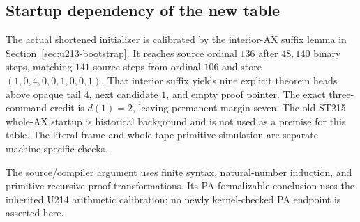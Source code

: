 \subsection{Startup dependency of the new table}

The actual shortened initializer is calibrated by the interior-AX
suffix lemma in Section~\ref{sec:u213-bootstrap}.  It reaches source
ordinal $136$ after $48{,}140$ binary steps, matching $141$ source
steps from ordinal $106$ and store $(1,0,4,0,0,1,0,0,1)$.
That interior suffix yields nine explicit theorem heads above opaque
tail $4$, next candidate $1$, and empty proof pointer.  The exact
three-command credit is $d(1)=2$, leaving permanent margin seven.
The old ST215 whole-AX startup is historical background and is not
used as a premise for this table.  The literal frame and whole-tape
primitive simulation are separate machine-specific checks.

The source/compiler argument uses finite syntax, natural-number
induction, and primitive-recursive proof transformations.  Its
PA-formalizable conclusion uses the inherited U214 arithmetic
calibration; no newly kernel-checked PA endpoint is asserted here.
